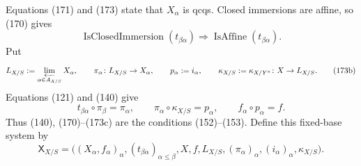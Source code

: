 \begin{definition}
\[  \]
  Equations (171) and (173) state that $X_\alpha$ is qcqs.
  Closed immersions are affine, so (170) gives
  \[
    \operatorname{IsClosedImmersion}(t_{\beta\alpha})
      \Longrightarrow\operatorname{IsAffine}(t_{\beta\alpha}).     \tag{173a}
  \]
  Put
  \[
    L_{X/S}:=\varprojlim_{\alpha\in A_{X/S}}X_\alpha,\qquad
    \pi_\alpha\colon L_{X/S}\to X_\alpha,\qquad
    p_\alpha:=i_\alpha,\qquad
    \kappa_{X/S}:=\kappa_{X/Y^\circ}\colon X\to L_{X/S}.            \tag{173b}
  \]
  Equations (121) and (140) give
  \[
    t_{\beta\alpha}\circ\pi_\beta=\pi_\alpha,\qquad
    \pi_\alpha\circ\kappa_{X/S}=p_\alpha,\qquad
    f_\alpha\circ p_\alpha=f.                                      \tag{173c}
  \]
  Thus (140), (170)--(173c) are the conditions (152)--(153).  Define this
  fixed-base system by
  \[
    \mathsf X_{X/S}
      =\bigl((X_\alpha,f_\alpha)_\alpha,
        (t_{\beta\alpha})_{\alpha\leq\beta},
        X,f,L_{X/S},(\pi_\alpha)_\alpha,
        (i_\alpha)_\alpha,\kappa_{X/S}\bigr).                      \tag{174}
  \]


\end{definition}
